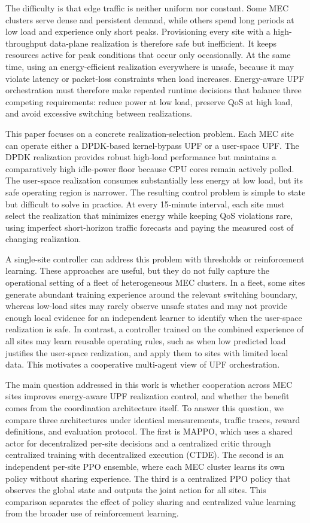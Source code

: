 \documentclass[10pt,conference,letterpaper]{IEEEtran}
\begin{document}
The difficulty is that edge traffic is neither uniform nor constant. Some MEC
clusters serve dense and persistent demand, while others spend long periods at
low load and experience only short peaks. Provisioning every site with a
high-throughput data-plane realization is therefore safe but inefficient. It
keeps resources active for peak conditions that occur only occasionally. At the
same time, using an energy-efficient realization everywhere is unsafe, because it
may violate latency or packet-loss constraints when load increases. Energy-aware
UPF orchestration must therefore make repeated runtime decisions that balance
three competing requirements: reduce power at low load, preserve QoS at high
load, and avoid excessive switching between realizations.

This paper focuses on a concrete realization-selection problem. Each MEC site
can operate either a DPDK-based kernel-bypass UPF or a user-space UPF. The DPDK
realization provides robust high-load performance but maintains a comparatively
high idle-power floor because CPU cores remain actively polled. The user-space
realization consumes substantially less energy at low load, but its safe
operating region is narrower. The resulting control problem is simple to state
but difficult to solve in practice. At every 15-minute interval, each site must
select the realization that minimizes energy while keeping QoS violations rare,
using imperfect short-horizon traffic forecasts and paying the measured cost of
changing realization.

A single-site controller can address this problem with thresholds or reinforcement learning. These approaches are useful, but they do not fully
capture the operational setting of a fleet of heterogeneous MEC clusters. In a
fleet, some sites generate abundant training experience around the relevant
switching boundary, whereas low-load sites may rarely observe unsafe states and
may not provide enough local evidence for an independent learner to identify
when the user-space realization is safe. In contrast, a controller trained on the
combined experience of all sites may learn reusable operating rules, such as
when low predicted load justifies the user-space realization, and apply them to
sites with limited local data. This motivates a cooperative multi-agent view of
UPF orchestration.

The main question addressed in this work is whether cooperation across MEC
sites improves energy-aware UPF realization control, and whether the benefit
comes from the coordination architecture itself. To answer this question, we
compare three architectures under identical measurements, traffic traces,
reward definitions, and evaluation protocol. The first is MAPPO, which uses a
shared actor for decentralized per-site decisions and a centralized critic
through centralized training with decentralized execution (CTDE). The second is
an independent per-site PPO ensemble, where each MEC cluster learns its own
policy without sharing experience. The third is a centralized PPO policy that
observes the global state and outputs the joint action for all sites. This
comparison separates the effect of policy sharing and centralized value learning
from the broader use of reinforcement learning.
\end{document}
